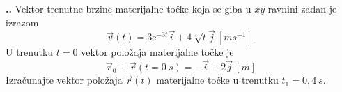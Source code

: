 
\noindent 
\textbf{
\thecjelina.\thezadatak.}
Vektor trenutne brzine materijalne točke koja se giba u $xy$-ravnini zadan je izrazom
$$
\vec{v}(t)=3\mathrm{e}^{-3t}\vec{i}+4\sqrt[4]{t}\vec{j}   \ [ms^{-1}]. 
$$
U trenutku $t = 0$ vektor položaja materijalne točke je
$$
\vec{r}_0\equiv \vec{r}(t=0\ s)=-\vec{i}+2\vec{j}\ [m]
$$
Izračunajte vektor položaja $\vec{r}(t)$ materijalne točke u trenutku $t_1 = 0,4\ s$.
